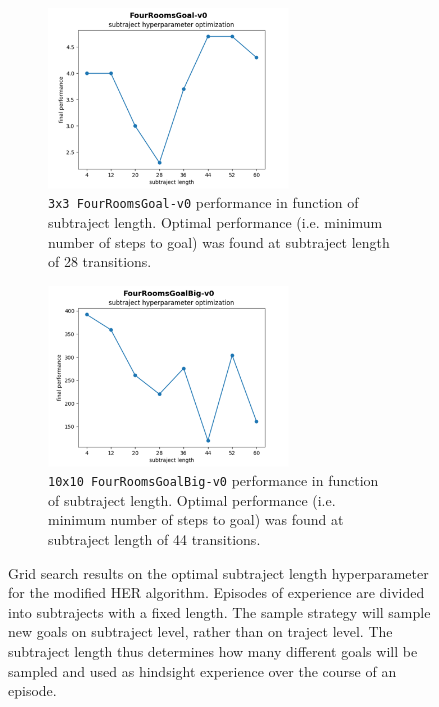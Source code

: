 \documentclass[conference]{IEEEtran}
\begin{document}
\begin{figure}[ht]
\centering
\begin{subfigure}[t]{0.45\textwidth}
\centering
\includegraphics[width=0.7\textwidth]{img/exp_tabular_her_gridsearch_small.png}
\caption{\texttt{3x3 FourRoomsGoal-v0} performance in function of subtraject length. Optimal performance (i.e. minimum number of steps to goal) was found at subtraject length of 28 transitions.}
\label{fig:experiment_subtraject_gridsearch_small}
\end{subfigure}
\hspace{1em}
\begin{subfigure}[t]{0.45\textwidth}
\centering
\includegraphics[width=0.7\textwidth]{img/exp_tabular_her_gridsearch_big.png}
\caption{\texttt{10x10 FourRoomsGoalBig-v0} performance in function of subtraject length. Optimal performance (i.e. minimum number of steps to goal) was found at subtraject length of 44 transitions.}
\label{fig:experiment_subtraject_gridsearch_big}
\end{subfigure}
\caption{Grid search results on the optimal subtraject length hyperparameter for the modified HER algorithm. Episodes of experience are divided into subtrajects with a fixed length. The sample strategy will sample new goals on subtraject level, rather than on traject level. The subtraject length thus determines how many different goals will be sampled and used as hindsight experience over the course of an episode.}
\label{fig:experiment_subtraject_gridsearch}
\end{figure}
\end{document}
